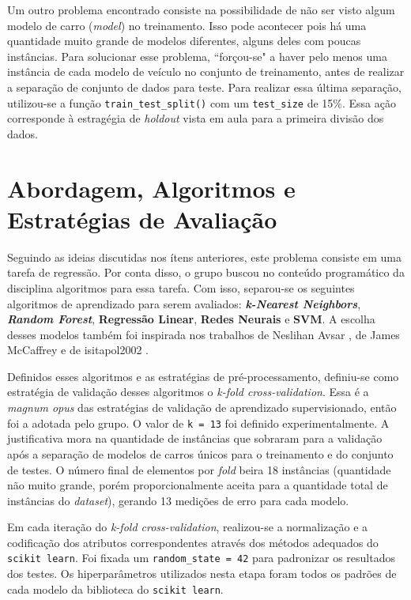 \documentclass{report}
\let\oldsection\section
\renewcommand\section{\clearpage\oldsection}
\begin{document}
Um outro problema encontrado consiste na possibilidade de não ser visto algum modelo de carro (\textit{model}) no treinamento. Isso pode acontecer pois há uma quantidade muito grande de modelos diferentes,
alguns deles com poucas instâncias. Para solucionar esse problema, ``forçou-se" a haver pelo menos uma instância de cada modelo de veículo no conjunto de treinamento, antes de realizar a separação de
conjunto de dados para teste. Para realizar essa última separação, utilizou-se a função \texttt{train\_test\_split()} com um \texttt{test\_size} de 15\%. Essa ação corresponde à estragégia de \textit{holdout}
vista em aula para a primeira divisão dos dados.

\section{Abordagem, Algoritmos e Estratégias de Avaliação}

Seguindo as ideias discutidas nos ítens anteriores, este problema consiste em uma tarefa de regressão. Por conta disso, o grupo buscou no conteúdo programático da disciplina algoritmos para essa tarefa.
Com isso, separou-se os seguintes algoritmos de aprendizado para serem avaliados: \textbf{\textit{k-Nearest Neighbors}}, \textbf{\textit{Random Forest}}, \textbf{Regressão Linear}, \textbf{Redes Neurais}
e \textbf{SVM}. A escolha desses modelos também foi inspirada nos trabalhos de Neslihan Avsar \cite{LinearRegression}, de James McCaffrey \cite{Regression} e de isitapol2002 \cite{MultRegression}.

Definidos esses algoritmos e as estratégias de pré-processamento, definiu-se como estratégia de validação desses algoritmos o \textit{k-fold cross-validation}. Essa é a \textit{magnum opus} das estratégias
de validação de aprendizado supervisionado, então foi a adotada pelo grupo. O valor de \texttt{k = 13} foi definido experimentalmente. A justificativa mora na quantidade de instâncias que
sobraram para a validação após a separação de modelos de carros únicos para o treinamento e do conjunto de testes. O número final de elementos por \textit{fold} beira 18 instâncias (quantidade não muito grande,
porém proporcionalmente aceita para a quantidade total de instâncias do \textit{dataset}), gerando 13 medições de erro para cada modelo.

Em cada iteração do \textit{k-fold cross-validation}, realizou-se a normalização e a codificação dos atributos correspondentes através dos métodos adequados do \texttt{scikit learn}. Foi fixada um \texttt{random\_state = 42}
para padronizar os resultados dos testes. Os hiperparâmetros utilizados nesta etapa foram todos os padrões de cada modelo da biblioteca do \texttt{scikit learn}.
\end{document}
